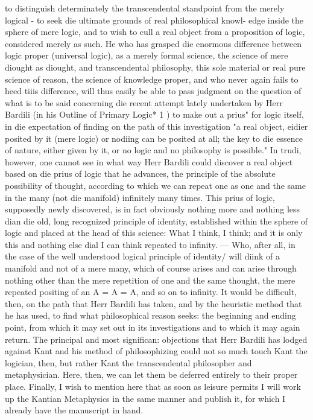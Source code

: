 to distinguish determinately the transcendental standpoint from the
merely logical - to seek die ultimate grounds of real philosophical knowl-
edge inside the sphere of mere logic, and to wish to cull a real object from a
proposition of logic, considered merely as such.
He who has grasped die enormous difference between logic proper
(universal logic), as a merely formal science, the science of mere diought
as diought, and transcendental philosophy, this sole material or real pure
science of reason, the science of knowledge proper, and who never again
fails to heed tiiis difference, will thus easily be able to pass judgment on
the question of what is to be said concerning die recent attempt lately
undertaken by Herr Bardili (in his Outline of Primary Logic* 1 ) to make out a
prius" for logic itself, in die expectation of finding on the path of this
investigation "a real object, eidier posited by it (mere logic) or nodiing can
be posited at all; the key to die essence of nature, either given by it, or no
logic and no philosophy is possible." In trudi, however, one cannot see in
what way Herr Bardili could discover a real object based on die prius of
logic that he advances, the principle of the absolute possibility of thought,
according to which we can repeat one as one and the same in the many (not
die manifold) infinitely many times. This prius of logic, supposedly newly
discovered, is in fact obviously nothing more and nothing less dian die
old, long recognized principle of identity, established within the sphere of
logic and placed at the head of this science: What I think, I think; and it is
only this and nothing else dial I can think repeated to infinity. — Who, after
all, in the case of the well understood logical principle of identity/ will
diink of a manifold and not of a mere many, which of course arises and can
arise through nothing other than the mere repetition of one and the same
thought, the mere repeated positing of an A = A = A, and so on to
infinity. It would be difficult, then, on the path that Herr Bardili has taken,
and by the heuristic method that he has used, to find what philosophical
reason seeks: the beginning and ending point, from which it may set out in
its investigations and to which it may again return. The principal and most
significan: objections that Herr Bardili has lodged against Kant and his
method of philosophizing could not so much touch Kant the logician, then,
but rather Kant the transcendental philosopher and metaphysician.
Here, then, we can let them be deferred entirely to their proper place.
Finally, I wish to mention here that as soon as leisure permits I will
work up the Kantian Metaphysics in the same manner and publish it, for
which I already have the manuscript in hand.

